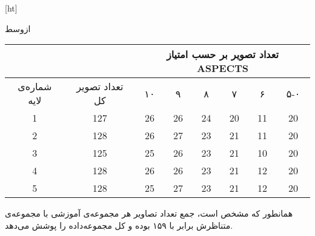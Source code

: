 [ht]

\vspace{1.5em}

‌ازوسط

\begin{tabular}{cccccccc}
    \cline{3-8}
                                                               &                                        & \multicolumn{6}{c}{تعداد تصویر بر حسب امتیاز ASPECTS}                                                                                                                                                                             \\ \hline
     
    {شماره‌ی لایه} & تعداد تصویر کل & {۱۰} & {۹} & {۸} & {۷} & {۶} & ۵-۰ \\ \hline
    {1}                                    & 127                                    & {26}                         & {26}                        & {24}                        & {20}                        & {11}                        & 20  \\
    {2}                                    & 128                                    & {26}                         & {27}                        & {23}                        & {21}                        & {11}                        & 20  \\ 
    {3}                                    & 125                                    & {25}                         & {26}                        & {23}                        & {21}                        & {10}                        & 20  \\ 
    {4}                                    & 128                                    & {26}                         & {26}                        & {23}                        & {21}                        & {12}                        & 20  \\ 
    {5}                                    & 128                                    & {25}                         & {27}                        & {23}                        & {21}                        & {12}                        & 20  \\ \hline
    \end{tabular}


همانطور که مشخص است، جمع تعداد تصاویر هر مجموعه‌ی آموزشی با مجموعه‌ی متناظرش برابر با ۱۵۹ بوده و کل مجموعه‌داده را پوشش می‌دهد.

